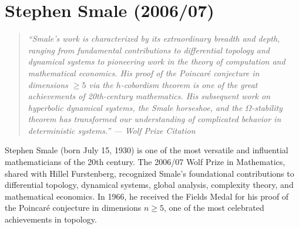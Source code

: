 \let\R\relax
\newcommand{\R}{\mathbb{R}}
\let\C\relax
\newcommand{\C}{\mathbb{C}}
\let\N\relax
\newcommand{\N}{\mathbb{N}}
\let\Z\relax
\newcommand{\Z}{\mathbb{Z}}
\let\Q\relax
\newcommand{\Q}{\mathbb{Q}}
\let\CP\relax
\newcommand{\CP}{\mathbb{CP}}
\let\RP\relax
\newcommand{\RP}{\mathbb{RP}}
\let\Diff\relax
\newcommand{\Diff}{\operatorname{Diff}}
\let\Hom\relax
\newcommand{\Hom}{\operatorname{Hom}}
\let\Aut\relax
\newcommand{\Aut}{\operatorname{Aut}}
\let\End\relax
\newcommand{\End}{\operatorname{End}}
\let\GL\relax
\newcommand{\GL}{\operatorname{GL}}
\let\SL\relax
\newcommand{\SL}{\operatorname{SL}}
\let\SO\relax
\newcommand{\SO}{\operatorname{SO}}
\let\Sp\relax
\newcommand{\Sp}{\operatorname{Sp}}
\let\Coker\relax
\newcommand{\Coker}{\operatorname{Coker}}
\let\im\relax
\newcommand{\im}{\operatorname{im}}
\let\Id\relax
\newcommand{\Id}{\operatorname{Id}}
\let\vol\relax
\newcommand{\vol}{\operatorname{vol}}
\let\Ric\relax
\newcommand{\Ric}{\operatorname{Ric}}
\let\Spec\relax
\newcommand{\Spec}{\operatorname{Spec}}
\let\Crit\relax
\newcommand{\Crit}{\operatorname{Crit}}
\let\grad\relax
\newcommand{\grad}{\operatorname{grad}}
\let\Hess\relax
\newcommand{\Hess}{\operatorname{Hess}}
\let\ind\relax
\newcommand{\ind}{\operatorname{ind}}
\let\supp\relax
\newcommand{\supp}{\operatorname{supp}}
\let\fix\relax
\newcommand{\fix}{\operatorname{fix}}

\chapter{Stephen Smale (2006/07)}

\begin{quote}
\it ``Smale's work is characterized by its extraordinary breadth and depth, ranging from fundamental contributions to differential topology and dynamical systems to pioneering work in the theory of computation and mathematical economics. His proof of the Poincar\'e conjecture in dimensions \(\geq 5\) via the \(h\)-cobordism theorem is one of the great achievements of 20th-century mathematics. His subsequent work on hyperbolic dynamical systems, the Smale horseshoe, and the \(\Omega\)-stability theorem has transformed our understanding of complicated behavior in deterministic systems.'' --- Wolf Prize Citation
\end{quote}

Stephen Smale (born July 15, 1930) is one of the most versatile and influential mathematicians of the 20th century. The 2006/07 Wolf Prize in Mathematics, shared with Hillel Furstenberg, recognized Smale's foundational contributions to differential topology, dynamical systems, global analysis, complexity theory, and mathematical economics. In 1966, he received the Fields Medal for his proof of the Poincar\'e conjecture in dimensions \(n \geq 5\), one of the most celebrated achievements in topology.

